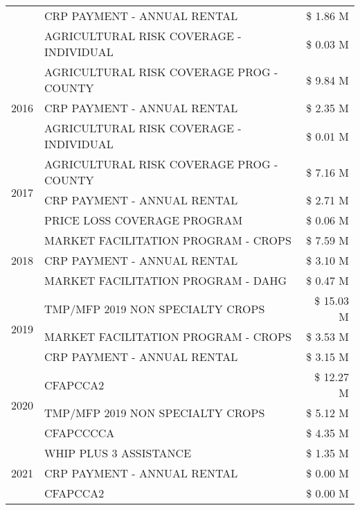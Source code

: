 \begin{tabular}{llr}
 & CRP PAYMENT - ANNUAL RENTAL & \$ 1.86 M \\
 & AGRICULTURAL RISK COVERAGE - INDIVIDUAL & \$ 0.03 M \\
\cline{1-3}
\multirow[t]{3}{*}{2016} & AGRICULTURAL RISK COVERAGE PROG - COUNTY & \$ 9.84 M \\
 & CRP PAYMENT - ANNUAL RENTAL & \$ 2.35 M \\
 & AGRICULTURAL RISK COVERAGE - INDIVIDUAL & \$ 0.01 M \\
\cline{1-3}
\multirow[t]{3}{*}{2017} & AGRICULTURAL RISK COVERAGE PROG - COUNTY & \$ 7.16 M \\
 & CRP PAYMENT - ANNUAL RENTAL & \$ 2.71 M \\
 & PRICE LOSS COVERAGE PROGRAM & \$ 0.06 M \\
\cline{1-3}
\multirow[t]{3}{*}{2018} & MARKET FACILITATION PROGRAM - CROPS & \$ 7.59 M \\
 & CRP PAYMENT - ANNUAL RENTAL & \$ 3.10 M \\
 & MARKET FACILITATION PROGRAM - DAHG & \$ 0.47 M \\
\cline{1-3}
\multirow[t]{3}{*}{2019} & TMP/MFP 2019 NON SPECIALTY CROPS & \$ 15.03 M \\
 & MARKET FACILITATION PROGRAM - CROPS & \$ 3.53 M \\
 & CRP PAYMENT - ANNUAL RENTAL & \$ 3.15 M \\
\cline{1-3}
\multirow[t]{3}{*}{2020} & CFAPCCA2 & \$ 12.27 M \\
 & TMP/MFP 2019 NON SPECIALTY CROPS & \$ 5.12 M \\
 & CFAPCCCCA & \$ 4.35 M \\
\cline{1-3}
\multirow[t]{3}{*}{2021} & WHIP PLUS 3 ASSISTANCE & \$ 1.35 M \\
 & CRP PAYMENT - ANNUAL RENTAL & \$ 0.00 M \\
 & CFAPCCA2 & \$ 0.00 M \\
\cline{1-3}
\bottomrule
\end{tabular}
